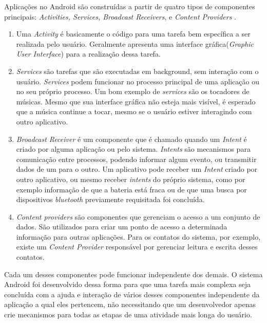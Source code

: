 Aplicações no Android são construídas a partir de quatro tipos de componentes principais: \textit{Activities, Services, Broadcast Receivers}, e \textit{Content Providers} \cite{heuser2014}. 

\begin{enumerate}
\item Uma \textit{Activity} é basicamente o código para uma tarefa bem específica a ser realizada pelo usuário. Geralmente apresenta uma interface gráfica(\textit{Graphic User Interface}) para a realização dessa tarefa. 

\item \textit{Services} são tarefas que são executadas em background, sem interação com o usuário. \textit{Services} podem funcionar no processo principal de uma aplicação ou no seu próprio processo. Um bom exemplo de \textit{services} são os tocadores de músicas. Mesmo que sua interface gráfica não esteja mais visível, é esperado que a música continue a tocar, mesmo se o usuário estiver interagindo com outro aplicativo. 

\item \textit{Broadcast Receiver} é um componente que é chamado quando um \textit{Intent} é criado por alguma aplicação ou pelo sistema. \textit{Intents} são mecanismos para comunicação entre processos, podendo informar algum evento, ou transmitir dados de um para o outro.
Um aplicativo pode receber um \textit{Intent} criado por outro aplicativo, ou mesmo receber \textit{intents} do próprio sistema, como por exemplo informação de que a bateria está fraca ou de que uma busca por dispositivos \textit{bluetooth} previamente requisitada foi concluída. 

\item \textit{Content providers} são componentes que gerenciam o acesso a um conjunto de dados. São utilizados para criar um ponto de acesso a determinada informação para outras aplicações. Para os contatos do sistema, por exemplo, existe um \textit{Content Provider} responsável por gerenciar leitura e escrita desses contatos. 
\end{enumerate}


Cada um desses componentes pode funcionar independente dos demais. O sistema Android foi desenvolvido dessa forma para que uma tarefa mais complexa seja concluída com a ajuda e interação de vários desses componentes independente da aplicação a qual eles pertencem, não necessitando que um desenvolvedor apenas crie mecanismos para todas as etapas de uma atividade mais longa do usuário.  

